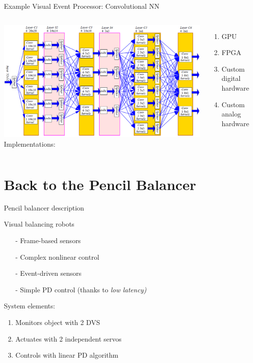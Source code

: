 \documentclass[11pt,center]{beamer}
\begin{document}
	\begin{frame}[c]{Example Visual Event Processor: Convolutional NN}
		\begin{columns}
			\includegraphics[width=\textwidth]{../pics/convnet.png}
			Implementations:
			\begin{enumerate}[<+->]
			  \item GPU
				\item FPGA
				\item Custom digital hardware
				\item Custom analog hardware
			\end{enumerate}
		\end{columns}
	\end{frame}

\section{Back to the Pencil Balancer}
	\begin{frame}{Pencil balancer description}
		\begin{block}{Visual balancing robots}
			\begin{description}
			  \item[Typical]
					\begin{itemize}
						\item[-] Frame-based sensors
						\item[-] Complex nonlinear control
					\end{itemize}
				\pause
				\item[This one]
					\begin{itemize}
						\item[-] Event-driven sensors
						\item[-] \alert{Simple PD control} (thanks to \em{low latency})
					\end{itemize}
			\end{description}
		\end{block}
		\vskip20pt

		\pause
		System elements:
		\begin{enumerate}
			\item Monitors object with 2 DVS
			\item Actuates with 2 independent servos
			\item Controls with linear PD algorithm
		\end{enumerate}
	\end{frame}
\end{document}
